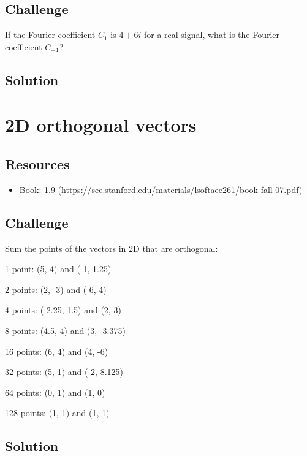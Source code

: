 \subsection*{Challenge}
If the Fourier coefficient $C_1$ is $4 + 6i$ for a real signal, what is the Fourier coefficient $C_{-1}$?

\subsection*{Solution}




\newpage
\section{2D orthogonal vectors}

\subsection*{Resources}
\begin{itemize}
    \item Book: 1.9 (\url{https://see.stanford.edu/materials/lsoftaee261/book-fall-07.pdf})
\end{itemize}

\subsection*{Challenge}
Sum the points of the vectors in 2D that are orthogonal:

1 point: (5, 4) and (-1, 1.25)

2 points:  (2, -3) and (-6, 4)

4 points: (-2.25, 1.5) and (2, 3)

8 points: (4.5, 4) and (3, -3.375)

16 points: (6, 4) and (4, -6)

32 points: (5, 1) and (-2, 8.125)

64 points: (0, 1) and (1, 0)

128 points: (1, 1) and (1, 1)

\subsection*{Solution}




\newpage
